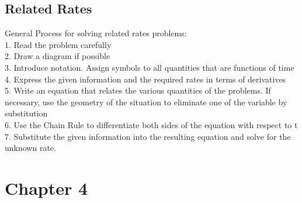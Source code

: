 \documentclass[10pt,a4paper]{article}
\begin{document}
	\subsection{Related Rates}
		General Process for solving related rates problems:
\\		1. Read the problem carefully
\\		2. Draw a diagram if possible
\\		3. Introduce notation. Assign symbols to all quantities that are functions of time
\\		4. Express the given information and the required rates in terms of derivatives
\\		5. Write an equation that relates the various quantities of the problems. If necessary, use the geometry of the situation to eliminate one of the variable by substitution
\\		6. Use the Chain Rule to differentiate both sides of the equation with respect to t
\\		7. Substitute the given information into the resulting equation and solve for the unknown rate.


\section{Chapter 4}
\end{document}

